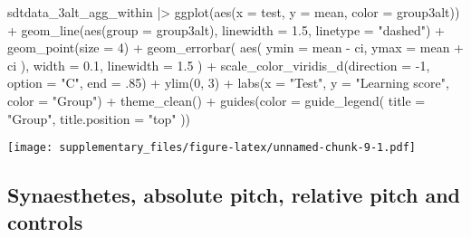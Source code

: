 \documentclass[
  man,floatsintext]{apa7}
\newenvironment{Shaded}{\begin{snugshade}}{\end{snugshade}}
\newcommand{\AttributeTok}[1]{\textcolor[rgb]{0.77,0.63,0.00}{#1}}
\newcommand{\DecValTok}[1]{\textcolor[rgb]{0.00,0.00,0.81}{#1}}
\newcommand{\FloatTok}[1]{\textcolor[rgb]{0.00,0.00,0.81}{#1}}
\newcommand{\FunctionTok}[1]{\textcolor[rgb]{0.00,0.00,0.00}{#1}}
\newcommand{\NormalTok}[1]{#1}
\newcommand{\SpecialCharTok}[1]{\textcolor[rgb]{0.00,0.00,0.00}{#1}}
\newcommand{\StringTok}[1]{\textcolor[rgb]{0.31,0.60,0.02}{#1}}
\begin{document}
\begin{Shaded}
\begin{Highlighting}[]
\NormalTok{sdtdata\_3alt\_agg\_within }\SpecialCharTok{|\textgreater{}}
  \FunctionTok{ggplot}\NormalTok{(}\FunctionTok{aes}\NormalTok{(}\AttributeTok{x =}\NormalTok{ test, }\AttributeTok{y =}\NormalTok{ mean, }\AttributeTok{color =}\NormalTok{ group3alt)) }\SpecialCharTok{+}
  \FunctionTok{geom\_line}\NormalTok{(}\FunctionTok{aes}\NormalTok{(}\AttributeTok{group =}\NormalTok{ group3alt), }\AttributeTok{linewidth =} \FloatTok{1.5}\NormalTok{, }\AttributeTok{linetype =} \StringTok{"dashed"}\NormalTok{) }\SpecialCharTok{+}
  \FunctionTok{geom\_point}\NormalTok{(}\AttributeTok{size =} \DecValTok{4}\NormalTok{) }\SpecialCharTok{+}
  \FunctionTok{geom\_errorbar}\NormalTok{(}
    \FunctionTok{aes}\NormalTok{(}
      \AttributeTok{ymin =}\NormalTok{ mean }\SpecialCharTok{{-}}\NormalTok{ ci,}
      \AttributeTok{ymax =}\NormalTok{ mean }\SpecialCharTok{+}\NormalTok{ ci}
\NormalTok{    ),}
    \AttributeTok{width =} \FloatTok{0.1}\NormalTok{, }\AttributeTok{linewidth =} \FloatTok{1.5}
\NormalTok{  ) }\SpecialCharTok{+}
  \FunctionTok{scale\_color\_viridis\_d}\NormalTok{(}\AttributeTok{direction =} \SpecialCharTok{{-}}\DecValTok{1}\NormalTok{, }\AttributeTok{option =} \StringTok{"C"}\NormalTok{, }\AttributeTok{end =}\NormalTok{ .}\DecValTok{85}\NormalTok{) }\SpecialCharTok{+}
  \FunctionTok{ylim}\NormalTok{(}\DecValTok{0}\NormalTok{, }\DecValTok{3}\NormalTok{) }\SpecialCharTok{+}
  \FunctionTok{labs}\NormalTok{(}\AttributeTok{x =} \StringTok{"Test"}\NormalTok{, }\AttributeTok{y =} \StringTok{"Learning score"}\NormalTok{, }\AttributeTok{color =} \StringTok{"Group"}\NormalTok{) }\SpecialCharTok{+}
  \FunctionTok{theme\_clean}\NormalTok{() }\SpecialCharTok{+}
  \FunctionTok{guides}\NormalTok{(}\AttributeTok{color =} \FunctionTok{guide\_legend}\NormalTok{(}
    \AttributeTok{title =} \StringTok{"Group"}\NormalTok{,}
    \AttributeTok{title.position =} \StringTok{"top"}
\NormalTok{  ))}
\end{Highlighting}
\end{Shaded}

\texttt{[image: supplementary\_files/figure-latex/unnamed-chunk-9-1.pdf]}

\hypertarget{synaesthetes-absolute-pitch-relative-pitch-and-controls}{%
\subsection{Synaesthetes, absolute pitch, relative pitch and controls}\label{synaesthetes-absolute-pitch-relative-pitch-and-controls}}
\end{document}
